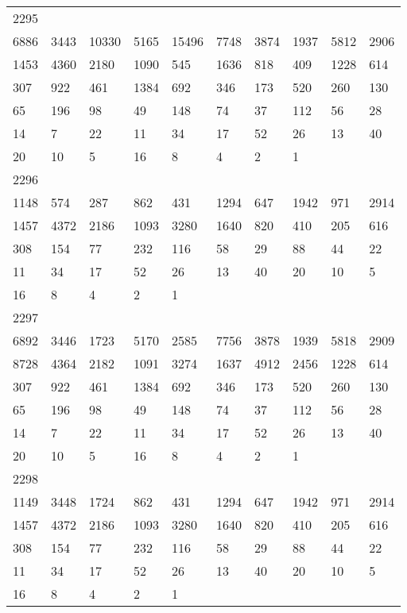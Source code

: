 \begin{longtable}{*{10}{l}}
2295&&&&&&&&&\\
6886& 3443& 10330& 5165& 15496& 7748& 3874& 1937& 5812& 2906\\
1453& 4360& 2180& 1090& 545& 1636& 818& 409& 1228& 614\\
307& 922& 461& 1384& 692& 346& 173& 520& 260& 130\\
65& 196& 98& 49& 148& 74& 37& 112& 56& 28\\
14& 7& 22& 11& 34& 17& 52& 26& 13& 40\\
20& 10& 5& 16& 8& 4& 2& 1& \\

2296&&&&&&&&&\\
1148& 574& 287& 862& 431& 1294& 647& 1942& 971& 2914\\
1457& 4372& 2186& 1093& 3280& 1640& 820& 410& 205& 616\\
308& 154& 77& 232& 116& 58& 29& 88& 44& 22\\
11& 34& 17& 52& 26& 13& 40& 20& 10& 5\\
16& 8& 4& 2& 1& \\

2297&&&&&&&&&\\
6892& 3446& 1723& 5170& 2585& 7756& 3878& 1939& 5818& 2909\\
8728& 4364& 2182& 1091& 3274& 1637& 4912& 2456& 1228& 614\\
307& 922& 461& 1384& 692& 346& 173& 520& 260& 130\\
65& 196& 98& 49& 148& 74& 37& 112& 56& 28\\
14& 7& 22& 11& 34& 17& 52& 26& 13& 40\\
20& 10& 5& 16& 8& 4& 2& 1& \\

2298&&&&&&&&&\\
1149& 3448& 1724& 862& 431& 1294& 647& 1942& 971& 2914\\
1457& 4372& 2186& 1093& 3280& 1640& 820& 410& 205& 616\\
308& 154& 77& 232& 116& 58& 29& 88& 44& 22\\
11& 34& 17& 52& 26& 13& 40& 20& 10& 5\\
16& 8& 4& 2& 1& \\


\end{longtable}
